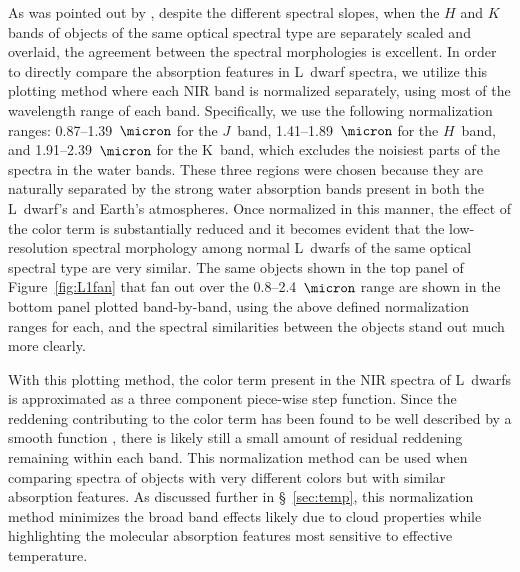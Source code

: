 \documentclass[12pt,preprint]{aastex}
\begin{document}

As was pointed out by \citet{Leggett:2003tm}, despite the different spectral slopes, when the $H$ and $K$ bands of objects of the same optical spectral type are separately scaled and overlaid, the agreement between the spectral morphologies is excellent.
In order to directly compare the absorption features in L~dwarf spectra, we utilize this plotting method where each NIR band is normalized separately, using most of the wavelength range of each band. 
Specifically, we use the following normalization ranges: 0.87--1.39~$\micron$ for the $J$~band, 1.41--1.89~$\micron$ for the $H$~band, and 1.91--2.39~$\micron$ for the K~band, which excludes the noisiest parts of the spectra in the water bands.
These three regions were chosen because they are naturally separated by the strong water absorption bands present in both the L~dwarf's and Earth's atmospheres. 
Once normalized in this manner, the effect of the color term is substantially reduced and it becomes evident that the low-resolution spectral morphology among normal L~dwarfs of the same optical spectral type are very similar. 
The same objects shown in the top panel of Figure~\ref{fig:L1fan} that fan out over the 0.8--2.4~$\micron$ range are shown in the bottom panel plotted band-by-band, using the above defined normalization ranges for each, and the spectral similarities between the objects stand out much more clearly.

With this plotting method, the color term present in the NIR spectra of L~dwarfs is approximated as a three component piece-wise step function. Since the reddening contributing to the color term has been found to be well described by a smooth function \citep[in prep.]{Hiranaka13,Marocco:2014kr}, there is likely still a small amount of residual reddening remaining within each band.
This normalization method can be used when comparing spectra of objects with very different colors but with similar absorption features. As discussed further in \S~\ref{sec:temp}, this normalization method minimizes the broad band effects likely due to cloud properties while highlighting the molecular absorption features most sensitive to effective temperature. 
\end{document}
